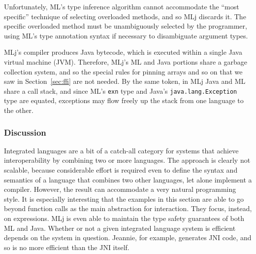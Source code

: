 Unfortunately, ML's type inference algorithm cannot accommodate the ``most specific'' technique of selecting overloaded methods, and so MLj discards it. The specific overloaded method must be unambiguously selected by the programmer, using ML's type annotation syntax if necessary to disambiguate argument types.

MLj's compiler produces Java bytecode, which is executed within a single Java virtual machine (JVM). Therefore, MLj's ML and Java portions share a garbage collection system, and so the special rules for pinning arrays and so on that we saw in Section~\ref{sec:ffi} are not needed. By the same token, in MLj Java and ML share a call stack, and since ML's \texttt{exn} type and Java's \texttt{java.lang.Exception} type are equated, exceptions may flow freely up the stack from one language to the other.

\subsubsection{Discussion}

Integrated languages are a bit of a catch-all category for systems that achieve interoperability by combining two or more languages. The approach is clearly not scalable, because considerable effort is required even to define the syntax and semantics of a language that combines two other languages, let alone implement a compiler. However, the result can accommodate a very natural programming style. It is especially interesting that the examples in this section are able to go beyond function calls as the main abstraction for interaction. They focus, instead, on expressions. MLj is even able to maintain the type safety guarantees of both ML and Java. Whether or not a given integrated language system is efficient depends on the system in question. Jeannie, for example, generates JNI code, and so is no more efficient than the JNI itself.

